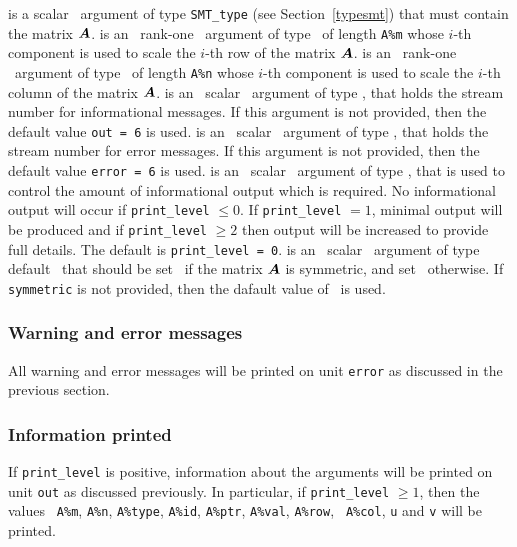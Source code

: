 \documentclass{galahad}
\begin{document}
\vspace*{-1mm}
\begin{description}
   is a scalar \intentinout\ argument of type {\tt SMT\_type} (see
     Section~\ref{typesmt}) that must contain the matrix ${\bm{A}}$.
   is an \optional\ rank-one \intentin\ argument of type \realdp\ of length
     {\tt A\%m} whose $i$-th component is used to scale the $i$-th
     row of the matrix ${\bm{A}}$.
   is an \optional\ rank-one \intentin\ argument of type \realdp\ of length
     {\tt A\%n} whose $i$-th component is used to scale the $i$-th
     column of the matrix ${\bm{A}}$.
   is an \optional\ scalar \intentin\ argument of type \integer, that holds the
     stream number for informational messages. If this argument is not
     provided, then the default value {\tt out = 6} is used.
   is an \optional\ scalar \intentin\ argument of type \integer, that holds the
     stream number for error messages. If this argument is not
     provided, then the default value {\tt error = 6} is used.
   is an \optional\ scalar \intentin\ argument of type \integer, that is used
     to control the amount of informational output which is required. No 
     informational output will occur if {\tt print\_level} $\leq 0$. If 
     {\tt print\_level} $= 1$, minimal output will be produced and if
     {\tt print\_level} $\geq 2$ then output will be
     increased to provide full details.
     The default is {\tt print\_level = 0}.
   is an \optional\ scalar \intentin\ argument of type default
     \logical\ that should be set \true\ if the matrix ${\bm{A}}$ is
     symmetric, and set \false\ otherwise.  If {\tt symmetric} is not
     provided, then the dafault value of \false\ is used. 
\end{description}

\subsubsection{Warning and error messages}\label{scaleA-error}

All warning and error messages will be printed on unit {\tt error} as
discussed in the previous section.

\subsubsection{Information printed}\label{scaleA-info}

If {\tt print\_level} is positive, information about the arguments
will be printed on unit {\tt out} as discussed previously.  In
particular, if {\tt print\_level} $\geq 1$, then the values {\tt
  A\%m}, {\tt A\%n}, {\tt A\%type}, {\tt A\%id},
{\tt A\%ptr}, {\tt A\%val}, {\tt A\%row}, {\tt
  A\%col}, {\tt u} and {\tt v} will be printed.
\end{document}
